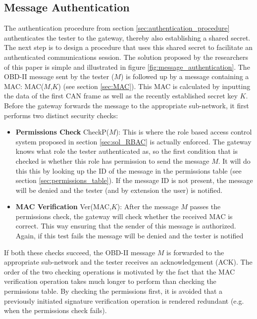 \documentclass[master=cws,masteroption=vs,english]{kulemt}
\begin{document}
\subsection{Message Authentication}
The authentication procedure from section \ref{sec:authentication_procedure} authenticates the tester to the gateway, thereby also establishing a shared secret. The next step is to design a procedure that uses this shared secret to facilitate an authenticated communications session. The solution proposed by the researchers of this paper is simple and illustrated in figure \ref{fig:message_authentication}. The OBD-II message sent by the tester ($M$) is followed up by a message containing a MAC: MAC($M$,$K$) (see section \ref{sec:MAC}). This MAC is calculated by inputting the data of the first CAN frame as well as the recently established secret key $K$. Before the gateway forwards the message to the appropriate sub-network, it first performs two distinct security checks: 
\begin{itemize}
	\item \textbf{Permissions Check} CheckP($M$): This is where the role based access control system proposed in section \ref{sec:sol_RBAC} is actually enforced. The gateway knows what role the tester authenticated as, so the first condition that is checked is whether this role has permission to send the message $M$. It will do this this by looking up the ID of the message in the permissions table (see section \ref{sec:permissions_table}). If the message ID is not present, the message will be denied and the tester (and by extension the user) is notified.
	
	\item \textbf{MAC Verification} Ver(MAC,$K$): After the message $M$ passes the permissions check, the gateway will check whether the received MAC is correct. This way ensuring that the sender of this message is authorized. Again, if this test fails the message will be denied and the tester is notified
\end{itemize}
If both these checks succeed, the OBD-II message $M$ is forwarded to the appropriate sub-network and the tester receives an acknowledgement (ACK). The order of the two checking operations is motivated by the fact that the MAC verification operation takes much longer to perform than checking the permissions table. By checking the permissions first, it is avoided that a previously initiated signature verification operation is rendered redundant (e.g. when the permissions check fails).
\end{document}
